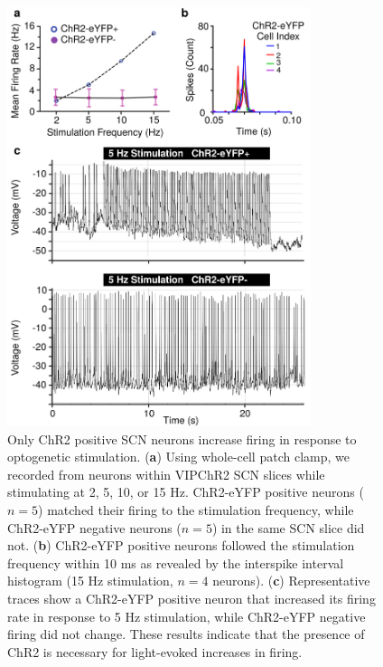 \begin{figure}[p]
    \begin{center}
        \includegraphics[width=3.5in]{chap5/figures/SupplementaryFigure2.png}
    \end{center}
    \caption{\label{fig:cms2} 
    Only ChR2 positive SCN neurons increase firing in response to optogenetic stimulation. 
    (\textbf{a}) Using whole-cell patch clamp, we recorded from neurons within VIPChR2 SCN slices while stimulating at 2, 5, 10, or 15 Hz. ChR2-eYFP positive neurons ($n = 5$) matched their firing to the stimulation frequency, while ChR2-eYFP negative neurons ($n = 5$) in the same SCN slice did not. 
    (\textbf{b}) ChR2-eYFP positive neurons followed the stimulation frequency within 10 ms as revealed by the interspike interval histogram (15 Hz stimulation, $n = 4$ neurons). 
    (\textbf{c}) Representative traces show a ChR2-eYFP positive neuron that increased its firing rate in response to 5 Hz stimulation, while ChR2-eYFP negative firing did not change. These results indicate that the presence of ChR2 is necessary for light-evoked increases in firing. 
    }
\end{figure}

